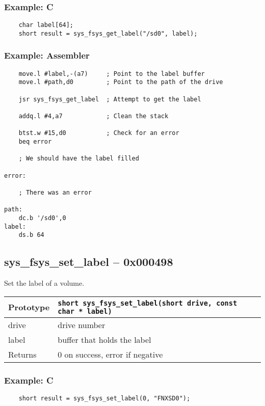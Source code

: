 \subsubsection*{Example: C}
\begin{lstlisting}
    char label[64];
    short result = sys_fsys_get_label("/sd0", label);
\end{lstlisting}

\subsubsection*{Example: Assembler}
\begin{verbatim}
    move.l #label,-(a7)     ; Point to the label buffer
    move.l #path,d0         ; Point to the path of the drive

    jsr sys_fsys_get_label  ; Attempt to get the label

    addq.l #4,a7            ; Clean the stack

    btst.w #15,d0           ; Check for an error
    beq error

    ; We should have the label filled

error:

    ; There was an error

path:
    dc.b '/sd0',0
label:
    ds.b 64
\end{verbatim}


\subsection*{sys\_fsys\_set\_label -- 0x000498}
Set the label of a volume.

\bigskip

\begin{tabular}{|l||l|} \hline
Prototype & \lstinline!short sys_fsys_set_label(short drive, const char * label)! \\ \hline
drive & drive number \\ \hline
label & buffer that holds the label \\ \hline
Returns & 0 on success, error if negative \\ \hline
\end{tabular}

\subsubsection*{Example: C}
\begin{lstlisting}
    short result = sys_fsys_set_label(0, "FNXSD0");
\end{lstlisting}

